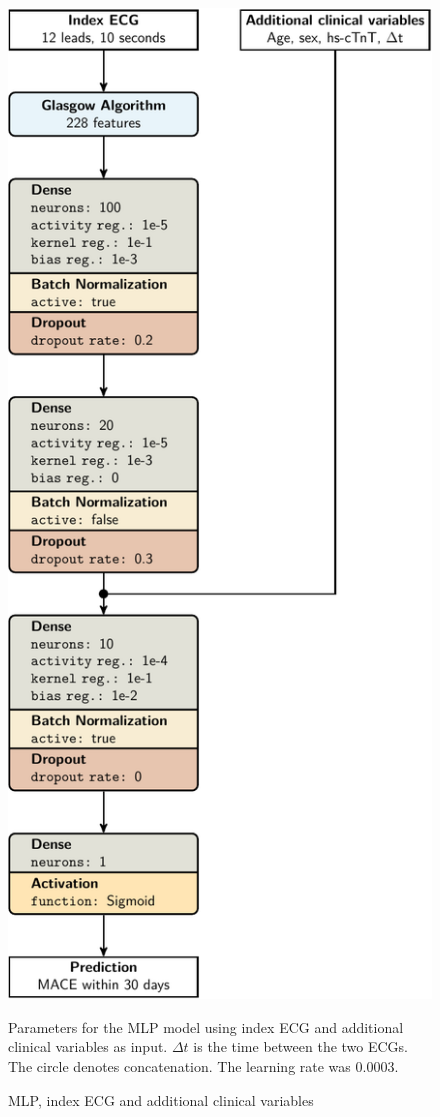 \documentclass[preprint]{elsarticle}
\begin{document}
\begin{figure}[H]
\centering
\includegraphics[scale=\modelscale,keepaspectratio,trim=-16em 0 0 0]{figures/model-mlp3.pdf}
\caption{MLP, index ECG and additional clinical variables}
\medskip
\small
Parameters for the MLP model using index ECG and additional clinical variables as input. $\Delta t$ is the time between the two ECGs. The circle denotes concatenation. The learning rate was 0.0003.
\end{figure}
\end{document}
